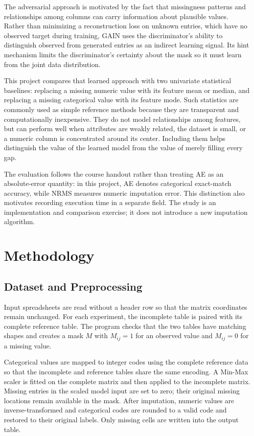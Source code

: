 \documentclass[11pt]{article}
\begin{document}
The adversarial approach is motivated by the fact that missingness patterns and relationships among columns can carry information about plausible values. Rather than minimizing a reconstruction loss on unknown entries, which have no observed target during training, GAIN uses the discriminator's ability to distinguish observed from generated entries as an indirect learning signal. Its hint mechanism limits the discriminator's certainty about the mask so it must learn from the joint data distribution.

This project compares that learned approach with two univariate statistical baselines: replacing a missing numeric value with its feature mean or median, and replacing a missing categorical value with its feature mode. Such statistics are commonly used as simple reference methods because they are transparent and computationally inexpensive. They do not model relationships among features, but can perform well when attributes are weakly related, the dataset is small, or a numeric column is concentrated around its center. Including them helps distinguish the value of the learned model from the value of merely filling every gap.

The evaluation follows the course handout rather than treating AE as an absolute-error quantity: in this project, AE denotes categorical exact-match accuracy, while NRMS measures numeric imputation error. This distinction also motivates recording execution time in a separate field. The study is an implementation and comparison exercise; it does not introduce a new imputation algorithm.

\section{Methodology}
\subsection{Dataset and Preprocessing}
Input spreadsheets are read without a header row so that the matrix coordinates remain unchanged. For each experiment, the incomplete table is paired with its complete reference table. The program checks that the two tables have matching shapes and creates a mask $M$ with $M_{ij}=1$ for an observed value and $M_{ij}=0$ for a missing value.

Categorical values are mapped to integer codes using the complete reference data so that the incomplete and reference tables share the same encoding. A Min-Max scaler is fitted on the complete matrix and then applied to the incomplete matrix. Missing entries in the scaled model input are set to zero; their original missing locations remain available in the mask. After imputation, numeric values are inverse-transformed and categorical codes are rounded to a valid code and restored to their original labels. Only missing cells are written into the output table.
\end{document}
